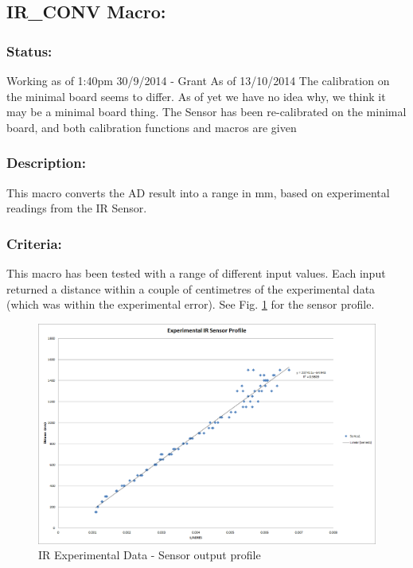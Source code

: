 \documentclass[]{report}
\begin{document}
\subsection{IR\_CONV Macro:}
\subsubsection{Status:}
Working as of 1:40pm 30/9/2014 - Grant \newline
As of 13/10/2014 The calibration on the minimal board seems to differ. As of yet we have no idea why, we think it may be a minimal board thing. \newline
The Sensor has been re-calibrated on the minimal board, and both calibration functions and macros are given

\subsubsection{Description:}
This macro converts the AD result into a range in mm, based on experimental readings from the IR Sensor.

\subsubsection{Criteria:}
This macro has been tested with a range of different input values. Each input returned a distance within a couple of centimetres of the experimental data (which was within the experimental error). See Fig. \ref{fig:IRExperimentalData} for the sensor profile.

\begin{figure}
\centering
\includegraphics[width=1\linewidth]{"IR Experimental Data"}
\caption{IR Experimental Data - Sensor output profile}
\label{fig:IRExperimentalData}
\end{figure}
\end{document}
